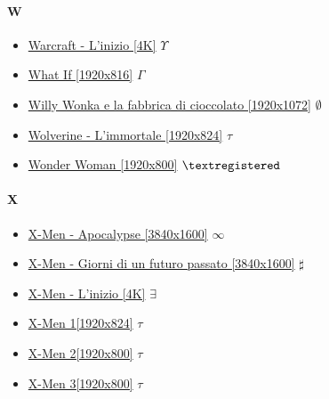 	\paragraph{W} \hypertarget{FIW}{}
		\begin{itemize}
			
			\item \href{https://mega.nz/#!7HJVQKIA!5-jCcdKg44n421fHWcaBoKGllBAeFQcL1JL5I1aYSLY} {Warcraft - L'inizio [4K]}  $\Upsilon$ \\ 
			\item \href{https://mega.nz/#!Ahc1wCSK!MacPCUzJR3DPYH31393ZzZVWsJQ-flV_k2jAXxn38IM} {What If [1920x816]}  $\Gamma$ \\ 
			\item \href{https://mega.nz/#!tW5FHILJ!qXafpAdtAXU47hrhucUO5YM7NUJ-5W6Xl8sv94i7KZQ} {Willy Wonka e la fabbrica di cioccolato [1920x1072]}  $\emptyset$ \\ 
			\item \href{https://mega.nz/#!Y1A1lQBA!Lx82SnoM-TvWdyt_V79_Hu22ZFq0tibwUH8XPqnG2V0} {Wolverine - L'immortale [1920x824]}  $\tau$ \\ 
			\item \href{https://mega.nz/#!SiRVEbIL!CPvVMEpTGk-nXRIeCF8HXqW1HcSpG0jrbfbdnjNNRAk} {Wonder Woman [1920x800]}  $\textregistered$ \\ 
		
		\end{itemize}

	\paragraph{X} \hypertarget{FIX}{}
		\begin{itemize}
			\item \href{https://mega.nz/#!MPxG0JqK!ooxzbtxlCd1I1FQJjDVZ7GwEFSe-wSLQveRmkbok8sY} {X-Men - Apocalypse [3840x1600]}  $\infty$ \\ 
			\item \href{https://mega.nz/#!Y7x3yDpT!GFAOmJcWQ5REte8xkWN0wtozJFMyvuQT2ztOTDJ0Ykc} {X-Men - Giorni di un futuro passato [3840x1600]}  $\sharp$ \\ 
			\item \href{https://mega.nz/#!7qQ3QYDS!-fXaNE7HWsQspjruZx5RDEFtqkm3YgJjzDcLwGoy0Og} {X-Men - L'inizio [4K]}  $\exists$ \\ 
			\item \href{https://mega.nz/#!RppkhJpK!HP-etHJllnJ6lKfZnmw1s1mAq_xXrykk0Cm_Nyc7eQM} {X-Men 1[1920x824]}  $\tau$ \\ 
			\item \href{https://mega.nz/#!50I0CbzY!0XjgindxpTreJpuAVE6PvW0NGvyBoZQWhruMy9HxGIE} {X-Men 2[1920x800]}  $\tau$ \\ 
			\item \href{https://mega.nz/#!5h4XjIqb!I1lmOB2I87HMfMmOLhscR3za_FZZdbWhFn7kYhJzKkM} {X-Men 3[1920x800]}  $\tau$ \\ 
			
		
		\end{itemize}	
	
